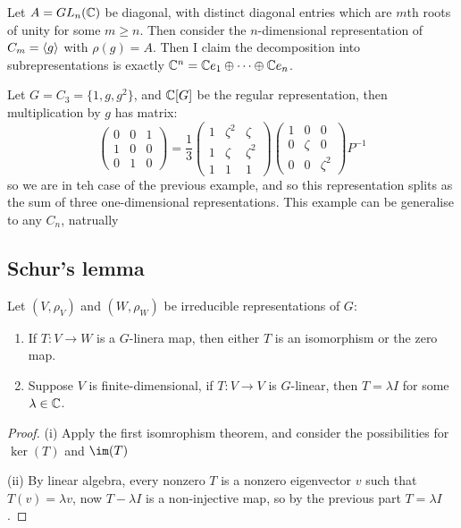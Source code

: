 \documentclass{article}
\begin{document}
Let $A=GL_n(\mathbb{C})$ be diagonal, with distinct diagonal entries which are $m$th roots of unity for some $m\geq n$. Then consider the $n$-dimensional representation of $C_m=\left\langle g \right\rangle$ with $\rho(g)=A$. Then I claim the decomposition into subrepresentations is exactly $\mathbb{C}^n = \mathbb{C} e_1 \oplus \cdots \oplus \mathbb{C} e_n$.

Let $G=C_3 = \{1,g,g^2\}$, and $\mathbb{C}[G]$ be the regular representation, then multiplication by $g$ has matrix: \[
\begin{pmatrix}
    0 & 0 & 1 \\
    1 & 0 & 0 \\
    0 & 1 & 0
\end{pmatrix} = \frac{1}{3}\begin{pmatrix}
    1 & \zeta^2 & \zeta \\
    1 & \zeta & \zeta^2 \\
    1 & 1 & 1
\end{pmatrix}\begin{pmatrix}
    1 & 0 & 0 \\
    0 & \zeta & 0 \\
    0 & 0 & \zeta^2
\end{pmatrix}P^{-1}
\] so we are in teh case of the previous example, and so this representation splits as the sum of three one-dimensional representations. This example can be generalise to any $C_n$, natrually

\subsection{Schur's lemma}

\begin{theorem}
    Let $(V,\rho_V)$ and $(W,\rho_W)$ be irreducible representations of $G$:\begin{enumerate}
        \item[(i)] If $T:V\rightarrow W$ is a $G$-linera map, then either $T$ is an isomorphism or the zero map.
        \item[(ii)] Suppose $V$ is finite-dimensional, if $T:V\rightarrow V$ is $G$-linear, then $T=\lambda I$ for some $\lambda\in\mathbb{C}$.
    \end{enumerate}
    \begin{proof}
        (i) Apply the first isomrophism theorem, and consider the possibilities for $\ker(T)$ and $\im(T)$

        (ii) By linear algebra, every nonzero $T$ is a nonzero eigenvector $v$ such that $T(v)=\lambda v$, now $T-\lambda I$ is a non-injective map, so by the previous part $T=\lambda I$.
    \end{proof}
\end{theorem}
\end{document}
